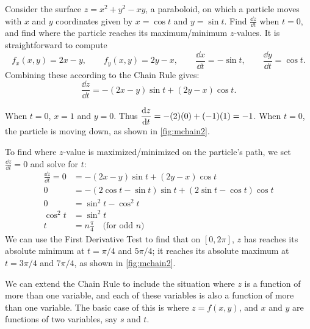 \begin{example}\label{ex_mchain2}%
Consider the surface $z=x^2+y^2-xy$, a paraboloid, on which a particle moves with $x$ and $y$ coordinates given by $x=\cos t$ and $y=\sin t$. Find $\frac{\dd z}{\dd t}$ when $t=0$, and find where the particle reaches its maximum/minimum $z$-values.
\solution
It is straightforward to compute
\[f_x(x,y) = 2x-y,\qquad f_y(x,y) = 2y-x,\qquad \frac{\dd x}{\dd t} = -\sin t,\qquad \frac{\dd y}{\dd t} = \cos t.\]
Combining these according to the Chain Rule gives:
\[\frac{\dd z}{\dd t} = -(2x-y)\sin t + (2y-x)\cos t.\]

When $t=0$, $x=1$ and $y=0$. Thus $\displaystyle\frac{\operatorname{d}\! z}{\operatorname{d}\! t} = -(2)(0)+ (-1)(1) = -1$. When $t=0$, the particle is moving down, as shown in \autoref{fig:mchain2}. 


To find where $z$-value is maximized/minimized on the particle's path, we set $\frac{\dd z}{\dd t}=0$ and solve for $t$:
\begin{align*}
\frac{\dd z}{\dd t} =0
	&= -(2x-y)\sin t + (2y-x)\cos t\\
	0&= -(2\cos t-\sin t)\sin t+(2\sin t-\cos t)\cos t\\
	0&= \sin^2t-\cos^2t\\
\cos^2t &=\sin^2t\\
	t&= n\frac{\pi}4\quad \text{(for odd $n$)}
\end{align*}
We can use the First Derivative Test to find that on $[0,2\pi]$, $z$ has reaches its absolute minimum at $t=\pi/4$ and $5\pi/4$; it reaches its absolute maximum at $t=3\pi/4$ and $7\pi/4$, as shown in \autoref{fig:mchain2}.
\end{example}


We can extend the Chain Rule to include the situation where $z$ is a function of more than one variable, and each of these variables is also a function of more than one variable. The basic case of this is where $z=f(x,y)$, and $x$ and $y$ are functions of two variables, say $s$ and $t$.

